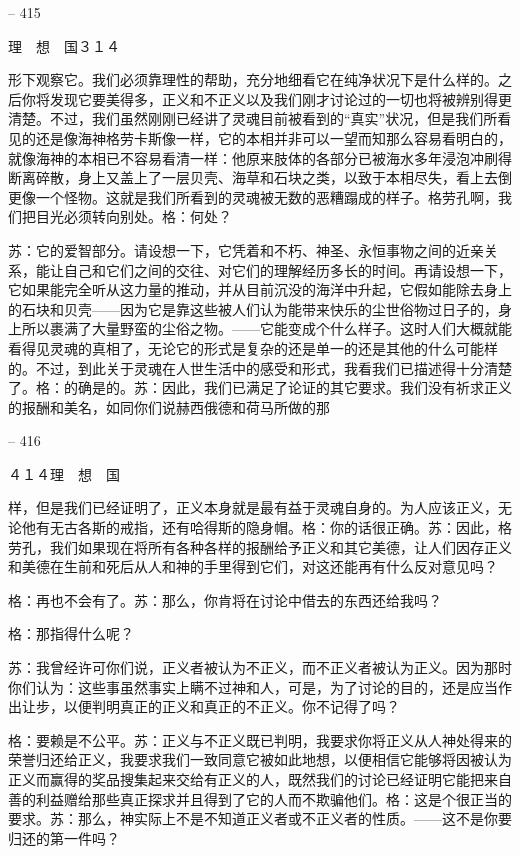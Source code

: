 \documentclass[11pt,oneside]{book}
\begin{document}
\begin{common-format}
    

-- 415

    理　想　国３１４

    形下观察它。我们必须靠理性的帮助，充分地细看它在纯净状况下是什么样的。之后你将发现它要美得多，正义和不正义以及我们刚才讨论过的一切也将被辨别得更清楚。不过，我们虽然刚刚已经讲了灵魂目前被看到的“真实”状况，但是我们所看见的还是像海神格劳卡斯像一样，它的本相并非可以一望而知那么容易看明白的，就像海神的本相已不容易看清一样：他原来肢体的各部分已被海水多年浸泡冲刷得断离碎散，身上又盖上了一层贝壳、海草和石块之类，以致于本相尽失，看上去倒更像一个怪物。这就是我们所看到的灵魂被无数的恶糟蹋成的样子。格劳孔啊，我们把目光必须转向别处。格：何处？

    苏：它的爱智部分。请设想一下，它凭着和不朽、神圣、永恒事物之间的近亲关系，能让自己和它们之间的交往、对它们的理解经历多长的时间。再请设想一下，它如果能完全听从这力量的推动，并从目前沉没的海洋中升起，它假如能除去身上的石块和贝壳——因为它是靠这些被人们认为能带来快乐的尘世俗物过日子的，身上所以裹满了大量野蛮的尘俗之物。——它能变成个什么样子。这时人们大概就能看得见灵魂的真相了，无论它的形式是复杂的还是单一的还是其他的什么可能样的。不过，到此关于灵魂在人世生活中的感受和形式，我看我们已描述得十分清楚了。格：的确是的。苏：因此，我们已满足了论证的其它要求。我们没有祈求正义的报酬和美名，如同你们说赫西俄德和荷马所做的那

    

-- 416

    ４１４理　想　国

    样，但是我们已经证明了，正义本身就是最有益于灵魂自身的。为人应该正义，无论他有无古各斯的戒指，还有哈得斯的隐身帽。格：你的话很正确。苏：因此，格劳孔，我们如果现在将所有各种各样的报酬给予正义和其它美德，让人们因存正义和美德在生前和死后从人和神的手里得到它们，对这还能再有什么反对意见吗？

    格：再也不会有了。苏：那么，你肯将在讨论中借去的东西还给我吗？

    格：那指得什么呢？

    苏：我曾经许可你们说，正义者被认为不正义，而不正义者被认为正义。因为那时你们认为：这些事虽然事实上瞒不过神和人，可是，为了讨论的目的，还是应当作出让步，以便判明真正的正义和真正的不正义。你不记得了吗？

    格：要赖是不公平。苏：正义与不正义既已判明，我要求你将正义从人神处得来的荣誉归还给正义，我要求我们一致同意它被如此地想，以便相信它能够将因被认为正义而赢得的奖品搜集起来交给有正义的人，既然我们的讨论已经证明它能把来自善的利益赠给那些真正探求并且得到了它的人而不欺骗他们。格：这是个很正当的要求。苏：那么，神实际上不是不知道正义者或不正义者的性质。——这不是你要归还的第一件吗？


\end{common-format}
\end{document}
